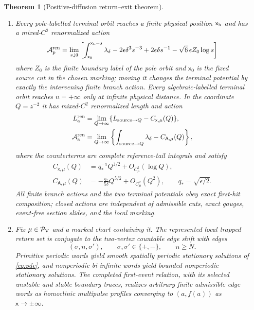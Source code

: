 \documentclass[11pt,reqno]{amsart}
\numberwithin{equation}{section}
\newtheorem{theorem}{Theorem}[section]
\theoremstyle{definition}
\theoremstyle{remark}
\newcommand{\cP}{\mathcal P}
\newcommand{\cA}{\mathcal A}
\begin{document}
\begin{theorem}[Positive-diffusion return--exit theorem]
\begin{enumerate}
 \item Every pole-labelled terminal orbit reaches a finite physical position
 $\mathsf x_{\rm b}$ and has a mixed-$C^2$ renormalized action
 \begin{equation}\label{eq:pole-main-fp}
 \cA^{\rm ren}_{\rm p}
  =\lim_{s\downarrow0}\left[
   \int_{\mathsf x_0}^{\mathsf x_{\rm b}-s}\lambda_\delta
   -2\epsilon\delta^3s^{-3}
   +2\epsilon\delta s^{-1}
   -\sqrt6\,\epsilon Z_0\log s\right]
 \end{equation}
 where $Z_0$ is the finite boundary label of the pole orbit and
 $\mathsf x_0$ is the fixed source cut in the chosen marking; moving it
 changes the terminal potential by exactly the intervening finite branch
 action.
 Every algebraic-labelled terminal orbit reaches $u=+\infty$ only at infinite
 physical distance.  In the coordinate $Q=z^{-2}$ it has mixed-$C^2$
 renormalized length and action
 \begin{equation}\label{eq:alg-main-fp}
  \begin{aligned}
   L^{\rm ren}_{\rm a}
    &=\lim_{Q\to\infty}
      \{L_{\mathrm{source}\to Q}-C_{\mathsf x,\mu}(Q)\},\\
   \cA^{\rm ren}_{\rm a}
    &=\lim_{Q\to\infty}
      \left\{\int_{\mathrm{source}\to Q}\lambda_\delta
                    -C_{\mathsf A,\mu}(Q)\right\},
  \end{aligned}
 \end{equation}
 where the counterterms are complete reference-tail integrals and satisfy
 \begin{equation}\label{eq:alg-counter-leading}
  \begin{aligned}
   C_{\mathsf x,\mu}(Q)
    &=q_*^{-1}Q^{1/2}+O_{C^2_\mu}(\log Q),\\
   C_{\mathsf A,\mu}(Q)
    &=-\frac{q_*}{5\delta}Q^{5/2}+O_{C^2_\mu}(Q^2),
    \qquad q_*=\sqrt{\epsilon/2}.
  \end{aligned}
 \end{equation}
 All finite branch actions and the two terminal potentials obey exact
 first-hit composition; closed actions are independent of admissible cuts,
 exact gauges, event-free section slides, and the local marking.

 \item Fix $\mu\in\cP_{\rm V}$ and a marked chart containing it.  The
 represented local trapped return set is conjugate to the two-vertex
 countable edge shift with edges
 \begin{equation}\label{eq:edges}
  (\sigma,n,\sigma'),\qquad \sigma,\sigma'\in\{+,-\},
  \qquad n\ge N.
 \end{equation}
 Primitive periodic words yield smooth spatially periodic stationary
 solutions of \eqref{eq:pde}, and nonperiodic bi-infinite words yield bounded
 nonperiodic stationary solutions.  The completed first-event relation, with
 its selected unstable and stable boundary traces, realizes arbitrary finite
 admissible edge words as homoclinic multipulse profiles converging to
 $(a,f(a))$ as $\mathsf x\to\pm\infty$.
\end{enumerate}
\end{theorem}
\end{document}
